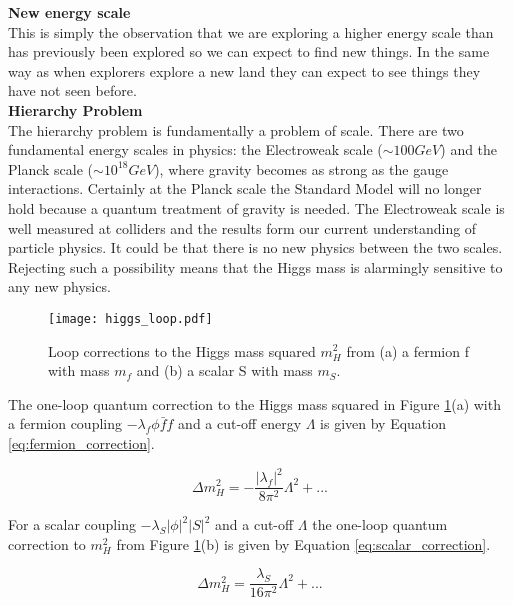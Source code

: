 {\bf New energy scale} \\

This is simply the observation that we are exploring a higher energy scale than
has previously been explored so we can expect to find new things. In the same
way as when explorers explore a new land they can expect to see things they
have not seen before. \\

{\bf Hierarchy Problem} \\

The hierarchy problem is fundamentally a problem of scale. There are two
fundamental energy scales in physics: the Electroweak scale ($\sim100\unit{GeV}$) and
the Planck scale ($\sim10^{18}\unit{GeV}$), where gravity becomes as strong as the 
gauge interactions. Certainly at the Planck scale the Standard Model will no
longer hold because a quantum treatment of gravity is needed. The Electroweak 
scale is well measured at colliders and the results form our current 
understanding of particle physics. It could be that there is no new physics 
between the two scales. Rejecting such a possibility means that the Higgs mass 
is alarmingly sensitive to any new physics. \\

\begin{figure}
\begin{center}
\texttt{[image: higgs\_loop.pdf]}
\end{center}
\caption{Loop corrections to the Higgs mass squared $m_{H}^{2}$ from (a) a 
fermion f with mass $m_{f}$ and (b) a scalar S with mass $m_{S}$.}
\label{fig:higgs_loop}
\end{figure}

The one-loop quantum correction to the Higgs mass squared in Figure 
\ref{fig:higgs_loop}(a) with a fermion coupling $-\lambda_{f}\phi\bar{f}f$ and 
a cut-off energy $\Lambda$ is given by Equation \ref{eq:fermion_correction}.

\begin{equation}
\Delta m_{H}^{2} = -\frac{|\lambda_{f}|^{2}}{8\pi^{2}}\Lambda^{2} + ...
\label{eq:fermion_correction}
\end{equation}

For a scalar coupling $-\lambda_{S}|\phi|^{2}|S|^{2}$ and a cut-off $\Lambda$ 
the one-loop quantum correction to $m_{H}^{2}$ from Figure 
\ref{fig:higgs_loop}(b) is given by Equation \ref{eq:scalar_correction}.

\begin{equation}
\Delta m_{H}^{2} = \frac{\lambda_{S}}{16\pi^{2}}\Lambda^{2} + ...
\label{eq:scalar_correction}
\end{equation}

